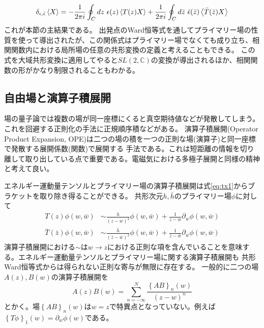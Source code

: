 \documentclass[11pt, aps, longbibliography]{article}
\numberwithin{equation}{section}
\begin{document}
        \begin{equation}\label{eq:conformal-ward}
            \delta_{\epsilon,\bar{\epsilon}}\expval{X} = -\frac{1}{2\pi i}\oint_C dz \ \epsilon(z)\expval{T(z)X} + \frac{1}{2\pi i}\oint_C d\bar{z} \ \bar{\epsilon}(\bar{z})\expval{\bar{T}(\bar{z})X}
        \end{equation}
        これが本節の主結果である。
        出発点のWard恒等式を通してプライマリー場の性質を使って導出されたが、この関係式はプライマリー場でなくても成り立ち、相関関数内における局所場の任意の共形変換の定義と考えることもできる。
        この式を大域共形変換に適用してやると$SL(2,\mathbb{C})$の変換が導出されるほか、相関関数の形がかなり制限されることもわかる。

    \subsection{自由場と演算子積展開}
        場の量子論では複数の場が同一座標にくると真空期待値などが発散してしまう。これを回避する正則化の手法に正規順序積などがある。
        演算子積展開(Operator Product Expansion, OPE)は二つの場の積を一つの正則な場(演算子)と同一座標で発散する展開係数(関数)で展開する
        手法である。これは短距離の情報を切り離して取り出している点で重要である。電磁気における多極子展開と同様の精神と考えて良い。

        エネルギー運動量テンソルとプライマリー場の演算子積展開は式\eqref{eq:tx1}からブラケットを取り除き得ることができる。
        共形次元$h,\bar{h}$のプライマリー場$\phi$に対して
        \begin{align}
            T(z)\phi(w,\bar{w}) &\sim \frac{h}{(z-w)^2}\phi(w,\bar{w}) + \frac{1}{z-w}\partial_w \phi(w,\bar{w}) \label{eq:OPE1} \\
            \bar{T}(\bar{z})\phi(w,\bar{w}) &\sim \frac{\bar{h}}{(\bar{z}-\bar{w})^2}\phi(w,\bar{w}) + \frac{1}{\bar{z}-\bar{w}}\partial_{\bar{w}} \phi(w,\bar{w})\label{eq:OPE2}
        \end{align}
        演算子積展開における$\sim$は$w\rightarrow z$における正則な項を含んでいることを意味する。エネルギー運動量テンソルとプライマリー場に関する演算子積展開も
        共形Ward恒等式からは得られない正則な寄与が無限に存在する。
        一般的に二つの場$A(z),B(w)$の演算子積展開を
        \begin{equation}\label{eq:OPE1}
            A(z)B(w) = \sum_{n=-\infty}^{N} \frac{\left\{ AB \right\}_n(w)}{(z-w)^n}
        \end{equation}
        とかく。場$\left\{ AB \right\}_n(w)$は$w=z$で特異点となっていない。例えば$\left\{ T\phi \right\}_1(w)=\partial_w \phi(w)$である。
\end{document}
